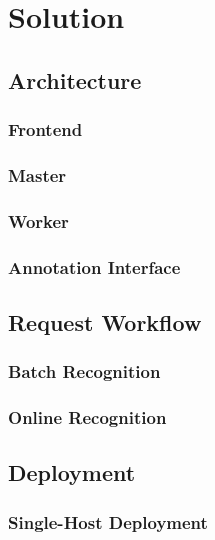\chapter{Solution}
\blindtext

\section{Architecture}
\blindtext

\subsection{Frontend}
\blindtext

\subsection{Master}
\blindtext

\subsection{Worker}
\blindtext

\subsection{Annotation Interface}
\blindtext


\section{Request Workflow}
\blindtext

\subsection{Batch Recognition}
\blindtext

\subsection{Online Recognition}
\blindtext


\section{Deployment}
\blindtext

\subsection{Single-Host Deployment}
\blindtext

